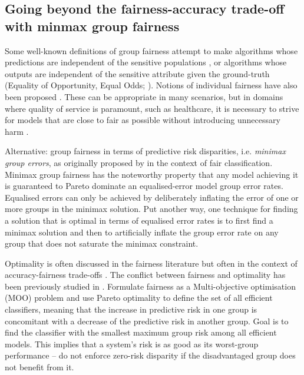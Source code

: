 
%
\subsection{Going beyond the fairness-accuracy trade-off with minmax group
fairness}\label{ssec:minmax-fairness}

Some well-known definitions of group fairness attempt to make algorithms whose predictions are
independent of the sensitive populations \citep{zemel, feldman2015certifying}, or algorithms whose
outputs are independent of the sensitive attribute given the ground-truth (Equality of Opportunity,
Equal Odds; \cite{hardt2016equality, woodworth2017learning}).
%
Notions of individual fairness have also been proposed \citep{dwork2012fairness}.
%
These can be appropriate in many scenarios, but in domains where quality of service is paramount,
such as healthcare, it is necessary to strive for models that are close to fair as possible without
introducing unnecessary harm \citep{ustun2019fairness}.

Alternative: group fairness in terms of predictive risk disparities, i.e. \emph{minimax group
errors}, as originally proposed by \cite{martinez2020minimax} in the context of fair
classification.
%
Minimax group fairness has the noteworthy property that any model achieving it is guaranteed to
Pareto dominate an equalised-error model \wrt{} group error rates.
Equalised errors can only be achieved by deliberately inflating the error of one or more groups in
the minimax solution.
%
Put another way, one technique for finding a solution that is optimal in terms of equalised error
rates is to first find a minimax solution and then to artificially  inflate the group error rate on
any group that does not saturate the minimax constraint.

Optimality is often discussed in the fairness literature but often in the context of
accuracy-fairness trade-offs \citep{kearns2018preventing, kearns2019ethical}.
The conflict between fairness and optimality has been previously studied in
\cite{kaplow1999conflict}.
%
Formulate fairness as a Multi-objective optimisation (MOO) problem and use Pareto optimality
\citep{sawaragi1985theory} to
define the set of all efficient classifiers, meaning that the increase in predictive risk in one
group is concomitant with a decrease of the predictive risk in another group.
Goal is to find the classifier with the smallest maximum group risk among all efficient models.
This implies that a system's risk is as good as its worst-group performance -- do not enforce
zero-risk disparity if the disadvantaged group does not benefit from it.

